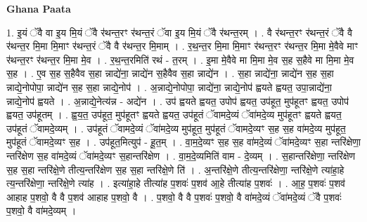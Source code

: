 \documentclass[17pt]{extarticle}
\begin{document}
\textbf{Ghana Paata } \newline

1. इ॒यं ॅवै वा इ॒य मि॒यं ॅवै र॑थन्त॒रꣳ र॑थन्त॒रं ॅवा इ॒य मि॒यं ॅवै र॑थन्त॒रम् । . वै र॑थन्त॒रꣳ र॑थन्त॒रं ॅवै वै र॑थन्त॒र मि॒मा मि॒माꣳ र॑थन्त॒रं ॅवै वै र॑थन्त॒र मि॒माम् । . र॒थ॒न्त॒र मि॒मा मि॒माꣳ र॑थन्त॒रꣳ र॑थन्त॒र मि॒मा मे॒वैवे माꣳ र॑थन्त॒रꣳ र॑थन्त॒र मि॒मा मे॒व । . र॒थ॒न्त॒रमिति॑ रथं - त॒रम् । . इ॒मा मे॒वैवे मा मि॒मा मे॒व स॒ह स॒हैवे मा मि॒मा मे॒व स॒ह । . ए॒व स॒ह स॒हैवैव स॒हा न्नाद्ये॑ना॒ न्नाद्ये॑न स॒हैवैव स॒हा न्नाद्ये॑न । . स॒हा न्नाद्ये॑ना॒ न्नाद्ये॑न स॒ह स॒हा न्नाद्ये॒नोपोपा॒ न्नाद्ये॑न स॒ह स॒हा न्नाद्ये॒नोप॑ । . अ॒न्नाद्ये॒नोपोपा॒ न्नाद्ये॑ना॒ न्नाद्ये॒नोप॑ ह्वयते ह्वयत॒ उपा॒न्नाद्ये॑ना॒ न्नाद्ये॒नोप॑ ह्वयते । . अ॒न्नाद्ये॒नेत्य॑न्न - अद्ये॑न । . उप॑ ह्वयते ह्वयत॒ उपोप॑ ह्वयत॒ उप॑हूत॒ मुप॑हूतꣳ ह्वयत॒ उपोप॑ ह्वयत॒ उप॑हूतम् । . ह्व॒य॒त॒ उप॑हूत॒ मुप॑हूतꣳ ह्वयते ह्वयत॒ उप॑हूतं ॅवामदे॒व्यं ॅवा॑मदे॒व्य मुप॑हूतꣳ ह्वयते ह्वयत॒ उप॑हूतं ॅवामदे॒व्यम् । . उप॑हूतं ॅवामदे॒व्यं ॅवा॑मदे॒व्य मुप॑हूत॒ मुप॑हूतं ॅवामदे॒व्यꣳ स॒ह स॒ह वा॑मदे॒व्य मुप॑हूत॒ मुप॑हूतं ॅवामदे॒व्यꣳ स॒ह । . उप॑हूत॒मित्युप॑ - हू॒त॒म् । . वा॒म॒दे॒व्यꣳ स॒ह स॒ह वा॑मदे॒व्यं ॅवा॑मदे॒व्यꣳ स॒हा न्तरि॑क्षेणा॒ न्तरि॑क्षेण स॒ह वा॑मदे॒व्यं ॅवा॑मदे॒व्यꣳ स॒हान्तरि॑क्षेण । . वा॒म॒दे॒व्यमिति॑ वाम - दे॒व्यम् । . स॒हान्तरि॑क्षेणा॒ न्तरि॑क्षेण स॒ह स॒हा न्तरि॑क्षे॒णे तीत्य॒न्तरि॑क्षेण स॒ह स॒हा न्तरि॑क्षे॒णे ति॑ । . अ॒न्तरि॑क्षे॒णे तीत्य॒न्तरि॑क्षेणा॒ न्तरि॑क्षे॒णे त्या॑हा॒हे त्य॒न्तरि॑क्षेणा॒ न्तरि॑क्षे॒णे त्या॑ह । . इत्या॑हा॒हे तीत्या॑ह प॒शवः॑ प॒शव॑ आ॒हे तीत्या॑ह प॒शवः॑ । . आ॒ह॒ प॒शवः॑ प॒शव॑ आहाह प॒शवो॒ वै वै प॒शव॑ आहाह प॒शवो॒ वै । . प॒शवो॒ वै वै प॒शवः॑ प॒शवो॒ वै वा॑मदे॒व्यं ॅवा॑मदे॒व्यं ॅवै प॒शवः॑ प॒शवो॒ वै वा॑मदे॒व्यम् । \newline
\end{document}
